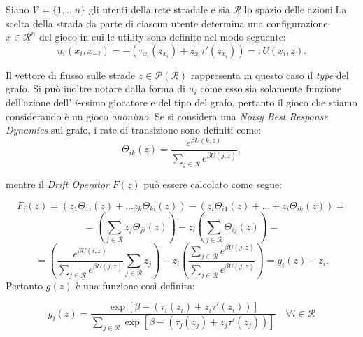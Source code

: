 Siano \(\mathcal{V} = \{1, \dots n\}\) gli utenti della rete stradale e sia \(\mathcal{R}\) lo spazio delle azioni.La scelta della strada da parte di ciascun utente determina una configurazione \(x \in \mathcal{R}^n\) del gioco in cui le utility sono definite nel modo seguente:
\[
    u_i (x_i, x_{- i}) = - (\tau_{x_i}(z_{x_i}) + z_{x_i}\tau'(z_{x_i})) = : U(x_{i}, z).\]

Il vettore di flusso sulle strade \(z \in \mathcal{P}(\mathcal{R})\) rappresenta in questo caso il \textit{type} del grafo. Si può inoltre notare dalla forma di \(u_i\) come esso sia solamente funzione dell'azione dell' \(i\)-esimo giocatore e del tipo del grafo, pertanto il gioco che stiamo considerando è un gioco \textit{anonimo}. Se si considera una \textit{Noisy Best Response Dynamics} sul grafo, i rate di transizione sono definiti come:
\begin{equation*}
    \Theta_{ik}(z) = \frac{e^{\beta U(k, z)}}{ \sum \limits_{j \in \mathcal{R}}^{} e^{\beta U(j, z)}},
\end{equation*} 

mentre il \textit{Drift Operator} \(F(z)\) può essere calcolato come segue:

\[
F_i(z) = (z_1 \Theta_{1i}(z) + \dots z_k \Theta_{ki}(z) ) - (z_i \Theta_{i1}(z) + \dots + z_i \Theta_{ik}(z) ) =
\]
\[ 
 = \left(\sum \limits_{j \in \mathcal{R}}^{} z_j \Theta_{ji}(z) \right) - z_i \left( \sum \limits_{j \in \mathcal{R}}^{} \Theta_{ij}(z)\right) =    
\]
\[
    = \left(\frac{e^{\beta U(i, z)}}{ \sum \limits_{j \in \mathcal{R}}^{} e^{\beta U(j, z)}}  \sum \limits_{j \in \mathcal{R}}^{} z_j \right) - z_i \left( \frac{\sum \limits_{j \in \mathcal{R}}^{} e^{\beta U(j, z)}}{ \sum \limits_{j \in \mathcal{R}}^{} e^{\beta U(j, z)}}\right) = g_i(z) - z_i.
\]
Pertanto \(g(z)\) è una funzione così definita:

\begin{equation*}
    g_i(z) = \frac{\exp [\beta - (\tau_{i}(z_{i}) + z_{i}\tau'(z_{i})) ]}{ \sum \limits_{j \in \mathcal{R}}^{} \exp [\beta - (\tau_{j}(z_{j}) + z_{j}\tau'(z_{j})) ]} \quad \forall i \in \mathcal{R}
\end{equation*}